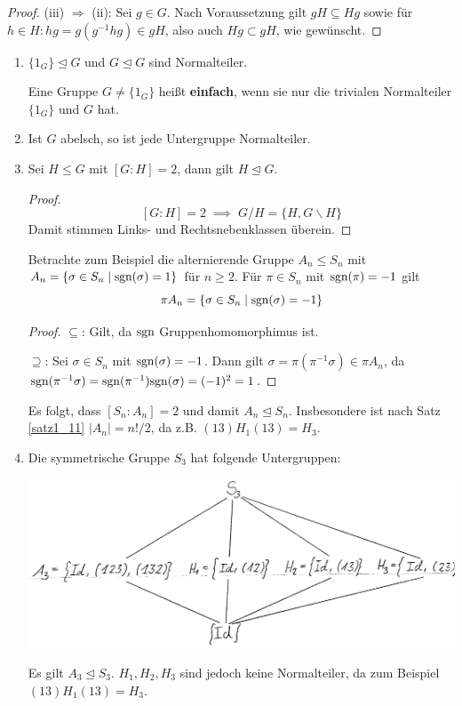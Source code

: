 \begin{proof}
	\glqq{}(iii) $\Rightarrow$ (ii)\grqq: Sei $g \in G$. Nach Voraussetzung gilt $gH \subseteq Hg$ sowie für $h \in H: hg = g(g^{-1}hg) \in gH$, also auch $Hg \subset gH$, wie gewünscht.
\end{proof}
\begin{beispiel}\label{beispiel1_15}
	\begin{enumerate}[label=(\arabic*)]
		\item $\{1_G\} \unlhd G$ und $G \unlhd G$ sind Normalteiler.
		
		Eine Gruppe $G \neq \{1_G\}$ heißt \textbf{einfach}, wenn sie nur die trivialen Normalteiler $\{1_G\}$ und $G$ hat.
		
		\item Ist $G$ abelsch, so ist jede Untergruppe Normalteiler.
		
		\item Sei $H \leq G$ mit $[G : H] = 2$, dann gilt $H \unlhd G$. 
		\begin{proof}
			\[[G:H] = 2 \;\implies\; G/H = \{H, G\backslash H\}\]
			Damit stimmen Links- und Rechtsnebenklassen überein.			
		\end{proof}
		Betrachte zum Beispiel die alternierende Gruppe $A_n \leq S_n$ mit $A_n = \{\sigma \in S_n \mid \mathrm{sgn}(\sigma) = 1\}$ für $n \geq 2$. Für $\pi \in S_n$ mit $\mathrm{sgn}(\pi) = -1$ gilt
		\[\pi A_n = \{\sigma \in S_n \mid \mathrm{sgn}(\sigma) = -1\}\]
		\begin{proof}
			$\subseteq$: Gilt, da $\mathrm{sgn}$ Gruppenhomomorphimus ist.
			
			$\supseteq$: Sei $\sigma \in S_n$ mit $\mathrm{sgn}(\sigma) = -1$. Dann gilt $\sigma = \pi(\pi^{-1} \sigma) \in \pi A_n$, da $\mathrm{sgn}(\pi^{-1} \sigma) = \mathrm{sgn}(\pi^{-1})\mathrm{sgn}(\sigma) = (-1)^2 = 1$.
		\end{proof}
		Es folgt, dass $[S_n : A_n] = 2$ und damit $A_n \unlhd S_n$. Insbesondere ist nach Satz \ref{satz1_11} $|A_n| = n! / 2$, 
		da z.B. $(13)H_1 (13) = H_3$.
		
		\item Die symmetrische Gruppe $S_3$ hat folgende Untergruppen:
		\begin{center}
			\includegraphics[scale=0.2]{images/beispiel1_15-4}
		\end{center}
		
		Es gilt $A_3 \unlhd S_3$. $H_1, H_2, H_3$ sind jedoch keine Normalteiler, da zum Beispiel $(13)H_1(13) = H_3$.
	\end{enumerate}
\end{beispiel}
